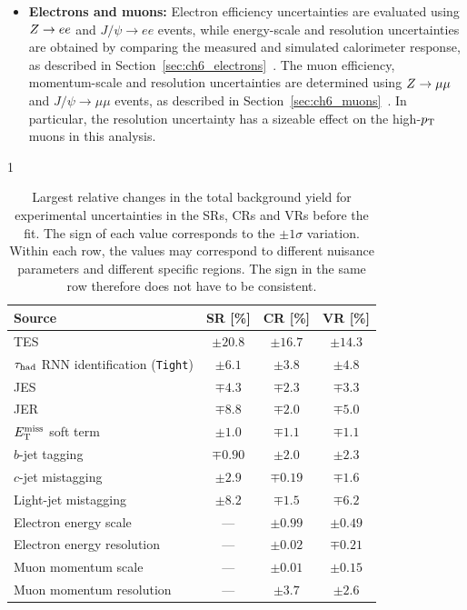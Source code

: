 \begin{itemize}[nosep,leftmargin=*]
\item \textbf{Electrons and muons:}
\label{subsec:ch9_leptons}
Electron efficiency uncertainties are evaluated using $Z\rightarrow ee$ and $J/\psi\to ee$ events, while energy-scale and resolution uncertainties are obtained by comparing the measured and simulated calorimeter response, as described in Section~\ref{sec:ch6_electrons}~\cite{ATLAS2019ElectronPerformance}.
The muon efficiency, momentum-scale and resolution uncertainties are determined using $Z\rightarrow\mu\mu$ and $J/\psi\to\mu\mu$ events, as described in Section~\ref{sec:ch6_muons}~\cite{ATLAS2021MuonID,ATLAS2023MuonCalibration}.
In particular, the resolution uncertainty has a sizeable effect on the high-$p_{\mathrm{T}}$ muons in this analysis.
\end{itemize}



\begin{table}[htbp]
    \centering
    \small
    \setlength{\tabcolsep}{5pt}
    \begin{spacing}{1}
    \caption[Largest relative changes in total background yield]{Largest relative changes in the total background yield for experimental uncertainties in the SRs, CRs and VRs before the fit. The sign of each value corresponds to the $\pm1\sigma$ variation. Within each row, the values may correspond to different nuisance parameters and different specific regions. The sign in the same row therefore does not have to be consistent.}
    \label{tab:ch9_experimental_region_groups}
    \begin{tabular}{lccc}
        \toprule
        Source & SR [\%] & CR [\%] & VR [\%] \\
        \midrule
        TES & $\pm20.8$ & $\pm16.7$ & $\pm14.3$ \\
        $\tau_{\mathrm{had}}$ RNN identification (\texttt{Tight}) & $\pm6.1$ & $\pm3.8$ & $\pm4.8$ \\
        JES & $\mp4.3$ & $\mp2.3$ & $\mp3.3$ \\
        JER & $\mp8.8$ & $\mp2.0$ & $\mp5.0$ \\
        $E_{\mathrm{T}}^{\mathrm{miss}}$ soft term & $\pm1.0$ & $\mp1.1$ & $\mp1.1$ \\
        $b$-jet tagging & $\mp0.90$ & $\pm2.0$ & $\pm2.3$ \\
        $c$-jet mistagging & $\pm2.9$ & $\mp0.19$ & $\mp1.6$ \\
        Light-jet mistagging & $\pm8.2$ & $\mp1.5$ & $\mp6.2$ \\
        Electron energy scale & --- & $\pm0.99$ & $\pm0.49$ \\
        Electron energy resolution & --- & $\pm0.02$ & $\mp0.21$ \\
        Muon momentum scale & --- & $\pm0.01$ & $\pm0.15$ \\
        Muon momentum resolution & --- & $\pm3.7$ & $\pm2.6$ \\
        \bottomrule
    \end{tabular}
    \end{spacing}
\end{table}


